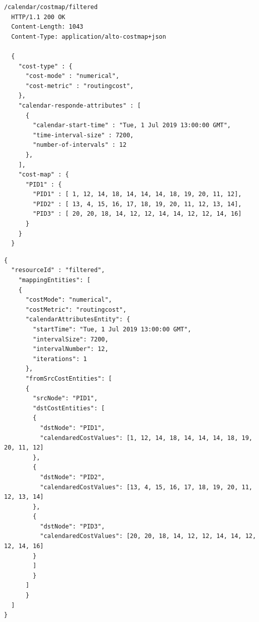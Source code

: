 \begin{center}
\begin{minipage}[t]{.43\textwidth}
\begin{lstlisting}[frame=lrbt, basicstyle=\tiny]
  /calendar/costmap/filtered
  HTTP/1.1 200 OK
  Content-Length: 1043
  Content-Type: application/alto-costmap+json

  {
    "cost-type" : {
      "cost-mode" : "numerical",
      "cost-metric" : "routingcost",
    },
    "calendar-responde-attributes" : [
      {
        "calendar-start-time" : "Tue, 1 Jul 2019 13:00:00 GMT",
        "time-interval-size" : 7200,
        "number-of-intervals" : 12
      },
    ],
    "cost-map" : {
      "PID1" : {
        "PID1" : [ 1, 12, 14, 18, 14, 14, 14, 18, 19, 20, 11, 12],
        "PID2" : [ 13, 4, 15, 16, 17, 18, 19, 20, 11, 12, 13, 14],
        "PID3" : [ 20, 20, 18, 14, 12, 12, 14, 14, 12, 12, 14, 16]
      }
    }
  }
\end{lstlisting}
\end{minipage}\hfill
\begin{minipage}[t]{.54\textwidth}
\begin{lstlisting}[frame=lrbt, basicstyle=\tiny]
{
  "resourceId" : "filtered",
    "mappingEntities": [
    {
      "costMode": "numerical",
      "costMetric": "routingcost",
      "calendarAttributesEntity": {
        "startTime": "Tue, 1 Jul 2019 13:00:00 GMT",
        "intervalSize": 7200,
        "intervalNumber": 12,
        "iterations": 1
      },
      "fromSrcCostEntities": [
      {
        "srcNode": "PID1",
        "dstCostEntities": [
        {
          "dstNode": "PID1",
          "calendaredCostValues": [1, 12, 14, 18, 14, 14, 14, 18, 19, 20, 11, 12]
        },
        {
          "dstNode": "PID2",
          "calendaredCostValues": [13, 4, 15, 16, 17, 18, 19, 20, 11, 12, 13, 14]
        },
        {
          "dstNode": "PID3",
          "calendaredCostValues": [20, 20, 18, 14, 12, 12, 14, 14, 12, 12, 14, 16]
        }
        ]
        }
      ]
      }
  ]
}
\end{lstlisting}
\end{minipage}
\label{lst:costmap-comparison}
\end{center}

